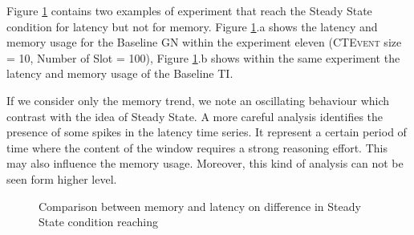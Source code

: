 Figure \ref{fig:level3-not-steady-naive-graph-en11} contains two examples of experiment that reach the Steady State condition for latency but not for memory. Figure \ref{fig:level3-not-steady-naive-graph-en11}.a shows the latency and memory usage for the Baseline GN within the experiment eleven (\textsc{CTEvent} size = 10, Number of Slot = 100), Figure \ref{fig:level3-not-steady-naive-graph-en11}.b shows within the same experiment the latency and memory usage of the Baseline TI. 

If we consider only the memory trend, we note an oscillating behaviour which contrast with the idea of Steady State. A more careful analysis identifies the presence of some spikes in the latency time series. It represent a certain period of time where the content of the window requires a strong reasoning effort. This may also influence the memory usage. Moreover, this kind of analysis can not be seen form higher level. 

\begin{figure}[tbh]
  \centering
  \caption[\textsc{Analyser} Investigation Stack - Level 3 - Intra Experiment Comparison - SOAK Test Latency vs Memory Not Steady State Reaching]{Comparison between memory and latency on difference in Steady State condition reaching} 
  \label{fig:level3-not-steady-naive-graph-en11}
\end{figure}

